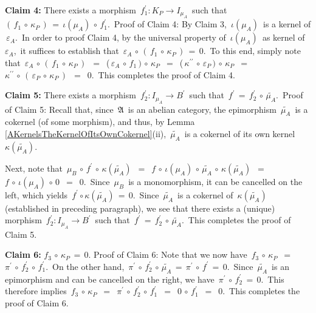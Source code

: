 \begin{enumerate}
	\vskip 0.3cm
	\textbf{Claim 4:}\;
	There exists a morphism
	\,$f_{1}^{\prime} : K_{P} \longrightarrow I_{\mu_{A}}$\,
	such that
	\,$(\,f_{1} \,\circ\, \kappa_{P}\,) \,=\, \iota(\mu_{A}) \,\circ\, f_{1}^{\prime}$.\,
	\vskip 0.01cm
	Proof of Claim 4:\;
	By Claim 3, \,$\iota(\mu_{A})$\, is a kernel of \,$\varepsilon_{A}$.\,
	In order to proof Claim 4, by the universal property of
	\,$\iota(\mu_{A})$\, as kernel of \,$\varepsilon_{A}$,\,
	it suffices to establish that
	\,$\varepsilon_{A} \,\circ\, (\,f_{1} \,\circ\, \kappa_{P}\,) \,=\, 0$.\,
	To this end, simply note that
	\,$\varepsilon_{A} \,\circ\, (\,f_{1} \,\circ\, \kappa_{P}\,)$
	\,$=$\, (\,$\varepsilon_{A} \,\circ\, f_{1}\,) \,\circ\, \kappa_{P}$
	\,$=$\, (\,$\kappa^{\prime\prime} \,\circ\, \varepsilon_{P}\,) \,\circ\, \kappa_{P}$
	\,$=$\, $\kappa^{\prime\prime} \,\circ\, (\,\varepsilon_{P} \,\circ\, \kappa_{P}\,)$
	\,$=$\, $0$.\,
	This completes the proof of Claim 4.


	\vskip 0.3cm
	\textbf{Claim 5:}\;
	There exists a morphism
	\,$f_{2}^{\prime} : I_{\mu_{A}} \longrightarrow B^{\prime}$\,
	such that
	\,$f^{\prime} \,=\, f_{2}^{\prime} \,\circ\, \widetilde{\mu_{A}}$.\,
	\vskip 0.01cm
	Proof of Claim 5:\;
	Recall that, since \,$\mathfrak{A}$\, is an abelian category,
	the epimorphism \,$\widetilde{\mu_{A}}$\, is a cokernel (of some morphism),
	and thus, by Lemma \ref{AKernelsTheKernelOfItsOwnCokernel}(ii),
	\,$\widetilde{\mu_{A}}$\, is a cokernel of its own kernel
	\,$\kappa(\widetilde{\mu_{A}})$.

	Next, note that
	\,$\mu_{B} \,\circ\, f^{\prime} \,\circ\, \kappa(\widetilde{\mu_{A}})$
	\,$=$\, $f \,\circ\, \iota(\mu_{A}) \,\circ\, \widetilde{\mu_{A}} \,\circ\, \kappa(\widetilde{\mu_{A}})$
	\,$=$\, $f \,\circ\, \iota(\mu_{A}) \,\circ\, 0$
	\,$=$\, $0$.\,
	Since \,$\mu_{B}$\, is a monomorphism, it can be cancelled on the left,
	which yields
	\,$ f^{\prime} \circ \kappa(\widetilde{\mu_{A}}) \,=\, 0$.\,
	Since \,$\widetilde{\mu_{A}}$\, is a cokernel of \,$\kappa(\widetilde{\mu_{A}})$\, (established in preceding paragraph),
	we see that there exists a (unique) morphism
	\,$f_{2}^{\prime} : I_{\mu_{A}} \longrightarrow B^{\prime}$\,
	such that
	\,$f^{\prime} \,=\, f_{2}^{\prime} \,\circ\, \widetilde{\mu_{A}}$.\,
	This completes the proof of Claim 5.
	

	\vskip 0.3cm
	\textbf{Claim 6:} \;$f_{3} \,\circ\, \kappa_{P} \,=\, 0$.
		\vskip 0.01cm
	Proof of Claim 6:\;
	Note that we now have
	\,$f_{3} \,\circ\, \kappa_{P}$
	\,$=$\, $\pi^{\prime} \,\circ\, f_{2}^{\prime} \,\circ\, f_{1}^{\prime}$.\,
	On the other hand,
	\,$\pi^{\prime} \,\circ\, f_{2}^{\prime} \,\circ\, \widetilde{\mu_{A}} \,=\, \pi^{\prime} \,\circ\, f^{\prime} \,=\, 0$.\,
	Since \,$\widetilde{\mu_{A}}$\, is an epimorphism and can be cancelled on the right,
	we have
	\,$\pi^{\prime} \,\circ\, f_{2}^{\prime} \,=\, 0$.\,
	This therefore implies
	\,$f_{3} \,\circ\, \kappa_{P}$
	\,$=$\, $\pi^{\prime} \,\circ\, f_{2}^{\prime} \,\circ\, f_{1}^{\prime}$
	\,$=$\, $0 \,\circ\, f_{1}^{\prime}$
	\,$=$\, $0$.\,
	This completes the proof of Claim 6.



\end{enumerate}
